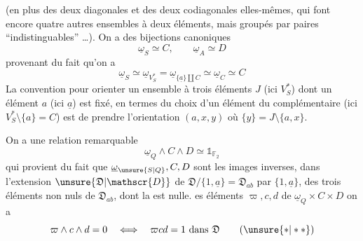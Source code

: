 (en plus des deux diagonales et des deux codiagonales elles-mêmes, qui font encore quatre autres ensembles à deux éléments, mais groupés par paires ``indistinguables'' \ldots). On a des bijections canoniques
\[
\underline\omega_S\simeq C,\qquad\underline\omega_A\simeq D
\]
provenant du fait qu'on a
\[
\underline\omega_S\simeq\underline\omega_{V_S^*}=\underline\omega_{\{\underline a\}\amalg C}\simeq\underline\omega_C\simeq C
\]
La convention pour orienter un ensemble à trois éléments $J$ (ici $V_S^*$) dont un élément $a$ (ici $\underline a$) est fixé, en termes du choix d'un élément  du complémentaire (ici $V_S^*\setminus\{a\}=C$) est de prendre l'orientation $(a,x,y)$  où $\{y\}=J\setminus\{a,x\}$.

On a une relation remarquable
\[
\underline\omega_Q\wedge C\wedge D\simeq\mathbb{1}_{\mathbb{F}_2}\tag*{($*$)}
\]
qui provient du fait que $\underline\omega_{\unsure{S|Q}}, C,D$ sont les images inverses, dans l'extension $\unsure{\mathfrak{D}|\mathscr{D}}$ de $\mathfrak{D}/\{1,\underline a\}=\mathfrak{D}_{ab}$ par $\{1,\underline a\}$, des trois éléments non nuls de $\mathfrak{D}_{ab}$, dont la   est nulle.  es éléments $\varpi,c,d$ de $\underline\omega_Q\times C\times D$  on a
\[
\varpi\wedge c\wedge d=0\quad\Longleftrightarrow\quad\varpi c d=1\text{ dans }\mathfrak{D}\tag*{($\unsure{*|**}$)}
\]
\margin{[Attention, cette relation \unsure{serait|devrait} inversée si on faisait une transposition sur l'ordre des facteurs -- il y a donc \deleted{\unsure{dans}} dans \deleted{\unsure{cette}} le choix de l'iso. $(*)$ une question de convention.}


